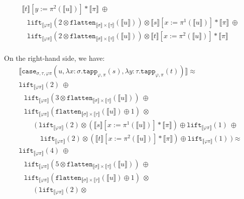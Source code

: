 \documentclass[a4paper,UKenglish,cleveref,autoref,numberwithinsect]{lipics-v2019}
\theoremstyle{definition}
\newcommand{\abs}[2]{\lambda #1.#2}
\newcommand{\flatten}{\mathtt{flatten}}
\newcommand{\lift}{\mathtt{lift}}
\newcommand{\typeinterpret}[1]{\llbracket #1 \rrbracket}
\newcommand{\interpret}[1]{\llbracket #1 \rrbracket}
\begin{document}
\begin{itemize}
\[\begin{array}{l}
    \interpret{t}[y:=\pi^2(\interpret{u})] * \typeinterpret{\pi}\ \oplus\\
  \phantom{A}
  \lift_{\typeinterpret{\varphi\pi}}(2 \otimes
    \flatten_{\typeinterpret{\sigma} \times \typeinterpret{\tau}}(
      \interpret{u})) \otimes \interpret{s}[x:=\pi^1(\interpret{u})]
      * \typeinterpret{\pi}\ \oplus \\
  \phantom{A}
  \lift_{\typeinterpret{\varphi\pi}}(2 \otimes
    \flatten_{\typeinterpret{\sigma} \times \typeinterpret{\tau}}(
      \interpret{u})) \otimes \interpret{t}[x:=\pi^2(\interpret{u})]
      * \typeinterpret{\pi} \\
  \end{array}
  \]

  On the right-hand side, we have:
  \[
  \begin{array}{l}
  \interpret{\mathtt{case}_{\sigma,\tau,\varphi\pi}(u,
    \abs{x:\sigma}{\mathtt{tapp}_{\varphi,\pi}(s)},
    \abs{y:\tau}{\mathtt{tapp}_{\varphi,\pi}(t)})} \approx \\
  \lift_{\typeinterpret{\varphi\pi}}(2)\ \oplus \\
  \phantom{A}
  \lift_{\typeinterpret{\varphi\pi}}(3 \otimes \flatten_{
    \typeinterpret{\sigma} \times \typeinterpret{\tau}}(
    \interpret{u}))\ \oplus \\
  \phantom{A}
  \lift_{\typeinterpret{\varphi\pi}}(\flatten_{\typeinterpret{\sigma}
    \times \typeinterpret{\tau}}(\interpret{u}) \oplus 1)\ \otimes \\
  \phantom{ABC}(\
    \lift_{\typeinterpret{\varphi\pi}}(2) \otimes
    (\typeinterpret{s}[x:=\pi^1(\interpret{u})]
      * \typeinterpret{\pi}) \oplus
    \lift_{\typeinterpret{\varphi\pi}}(1)\ \oplus \\
  \phantom{ABCD}
    \lift_{\typeinterpret{\varphi\pi}}(2) \otimes
    (\typeinterpret{t}[x:=\pi^2(\interpret{u})]
      * \typeinterpret{\pi}) \oplus
    \lift_{\typeinterpret{\varphi\pi}}(1)
  \ ) \approx \\
  \lift_{\typeinterpret{\varphi\pi}}(4)\ \oplus \\
  \phantom{A}
  \lift_{\typeinterpret{\varphi\pi}}(5 \otimes \flatten_{
    \typeinterpret{\sigma} \times \typeinterpret{\tau}}(
    \interpret{u}))\ \oplus \\
  \phantom{A}
  \lift_{\typeinterpret{\varphi\pi}}(\flatten_{\typeinterpret{\sigma}
    \times \typeinterpret{\tau}}(\interpret{u}) \oplus 1)\ \otimes \\
  \phantom{ABC}(\
    \lift_{\typeinterpret{\varphi\pi}}(2) \otimes

\end{array}\]
\end{itemize}
\end{document}
